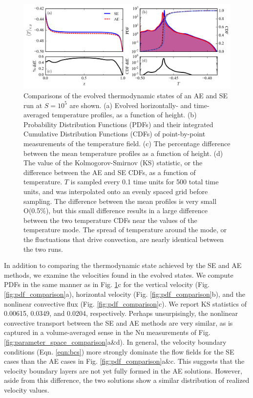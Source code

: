 \documentclass[aps, pre, onecolumn, nofootinbib, notitlepage, groupedaddress, amsfonts, amssymb, amsmath, longbibliography]{revtex4-1}
\begin{document}
\begin{figure}[t]
\includegraphics[width=\textwidth]{./figs/temp_comparison.png}
\caption{Comparisons of the evolved thermodynamic states of an AE and SE run
at $S = 10^{5}$ are shown.  (a) Evolved horizontally- and time-averaged 
temperature profiles, as a function of height.
(b) Probability Distribution Functions (PDFs) and their integrated
Cumulative Distribution Functions (CDFs)
of point-by-point measurements of the temperature field.
(c) The percentage difference between the mean temperature profiles as a function of height.
(d) The value of the Kolmogorov-Smirnov (KS) statistic, or the difference between
the AE and SE CDFs, as a function of temperature.
$T$ is sampled every 0.1 time units for 500 total time units,
and was interpolated onto an evenly spaced grid before sampling.
The difference between the mean profiles is very small O(0.5\%), but this small
difference results in a large difference between the two temperature CDFs near the values
of the temperature mode.  The spread of temperature around the mode, or the fluctuations that
drive convection, are nearly identical between the two runs.
\label{fig:temp_comparison} }
\end{figure}

In addition to comparing the thermodynamic state achieved by the SE and AE methods,
we examine the velocities found in the evolved states.
We compute PDFs in the same manner as in Fig. \ref{fig:temp_comparison}c for the
vertical velocity (Fig. \ref{fig:pdf_comparison}a), horizontal velocity (Fig. \ref{fig:pdf_comparison}b),
and the nonlinear convective flux (Fig. \ref{fig:pdf_comparison}c). We report KS statistics
of 0.00615, 0.0349, and 0.0204, respectively.  Perhaps unsurpisingly, the nonlinear
convective transport between the SE and AE methods are very similar, as is captured
in a volume-averaged sense in the Nu measurements of Fig. \ref{fig:parameter_space_comparison}a\&d).
In general, the velocity boundary conditions (Eqn. \ref{eqn:bcs}) more strongly dominate the flow
fields for the SE cases than the AE cases in Fig. \ref{fig:pdf_comparison}a\&c. 
This suggests that the velocity boundary layers are not yet fully formed in the
AE solutions. However, aside from this difference, the two solutions show a similar
distribution of realized velocity values.
\end{document}
